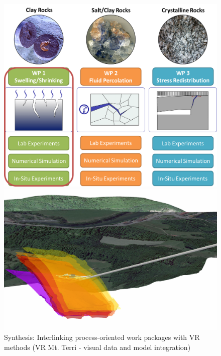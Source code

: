 \begin{figure}[ht!]
\begin{minipage}{0.49\textwidth}
\includegraphics[width=1\textwidth]{figures/geomint-wp1a.png}
\end{minipage}
\hfill
\begin{minipage}{0.49\textwidth}
\includegraphics[width=1\textwidth]{figures/mt-vr-01.png}
\end{minipage}
\caption{Synthesis: Interlinking process-oriented work packages with VR methods (VR Mt. Terri - visual data and model integration)}
\label{fig:pro03}
\end{figure}


